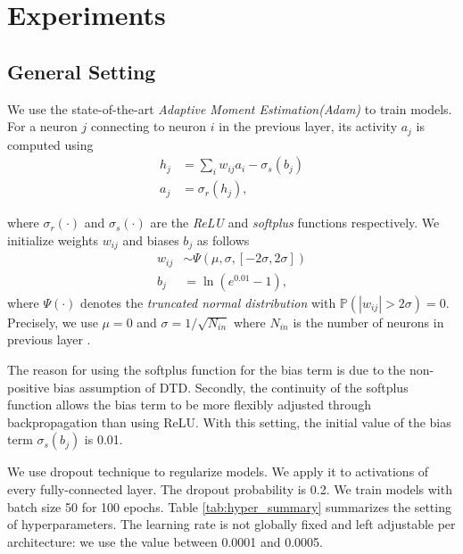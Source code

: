 \chapter{Experiments} \label{cha:chapter4}

\section{General Setting}\label{sec:setup}
 
 We use the state-of-the-art \textit{Adaptive Moment Estimation(Adam)} \citep{KingmaAdamMethodStochastic2014} to train models. For a neuron $j$ connecting to neuron $i$ in the previous layer, its activity $a_j$ is computed using
\begin{align*}
h_j &= \sum_{i} w_{ij} a_i - \sigma_s(b_j)
\\
a_j &= \sigma_r(h_j),
\end{align*}

where $\sigma_r(\cdot)$ and $\sigma_s(\cdot)$ are the \textit{ReLU} and \textit{softplus} functions respectively. We initialize weights $w_{ij}$ and biases $b_{j}$ as follows
\begin{align*}
	w_{ij} &\sim \Psi( \mu, \sigma, [-2\sigma, 2\sigma]) \\
	b_{j} &= \ln(e^{0.01} - 1),
\end{align*}
where $\Psi(\cdot)$ denotes the \textit{truncated normal distribution} with $\mathbb{P}(|w_{ij}| > 2\sigma) = 0$. Precisely, we use $\mu=0$ and $\sigma = 1/\sqrt{N_{in}}$ where $N_{in}$ is the number of neurons in previous layer \citep{GlorotUnderstandingdifficultytraining2010}.


The reason for using the softplus function for the bias term is due to the non-positive bias assumption of DTD. Secondly, the continuity of the softplus function allows the bias term to be more flexibly adjusted through backpropagation than using ReLU. With this setting, the initial value of the bias term  $\sigma_{s}(b_j)$ is 0.01.

We use dropout technique \citep{SrivastavaDropoutSimpleWay2014} to regularize models. We apply it to activations of every fully-connected layer. The dropout probability is 0.2. We train models with batch size 50 for 100 epochs. Table \ref{tab:hyper_summary} summarizes the setting of hyperparameters. The learning rate is not globally fixed and left adjustable per architecture: we use the value between 0.0001 and 0.0005.


